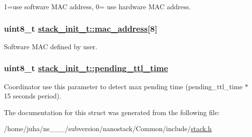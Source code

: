 1=use software MAC address, 0= use hardware MAC address. \hypertarget{structstack__init__t_e19c2be8fe2556624797d574f870626d}{
\subsubsection[mac\_\-address]{\setlength{\rightskip}{0pt plus 5cm}uint8\_\-t \hyperlink{structstack__init__t_e19c2be8fe2556624797d574f870626d}{stack\_\-init\_\-t::mac\_\-address}\mbox{[}8\mbox{]}}}
\label{structstack__init__t_e19c2be8fe2556624797d574f870626d}


Software MAC defined by user. \hypertarget{structstack__init__t_2b6a33578db7e0963d6c33431dd19c1d}{
\subsubsection[pending\_\-ttl\_\-time]{\setlength{\rightskip}{0pt plus 5cm}uint8\_\-t \hyperlink{structstack__init__t_2b6a33578db7e0963d6c33431dd19c1d}{stack\_\-init\_\-t::pending\_\-ttl\_\-time}}}
\label{structstack__init__t_2b6a33578db7e0963d6c33431dd19c1d}


Coordinator use this parameter to detect max pending time (pending\_\-ttl\_\-time $\ast$ 15 seconds period). 

The documentation for this struct was generated from the following file:\begin{CompactItemize}
\item 
/home/juha/ns\_\_\_/subversion/nanostack/Common/include/\hyperlink{stack_8h}{stack.h}\end{CompactItemize}
